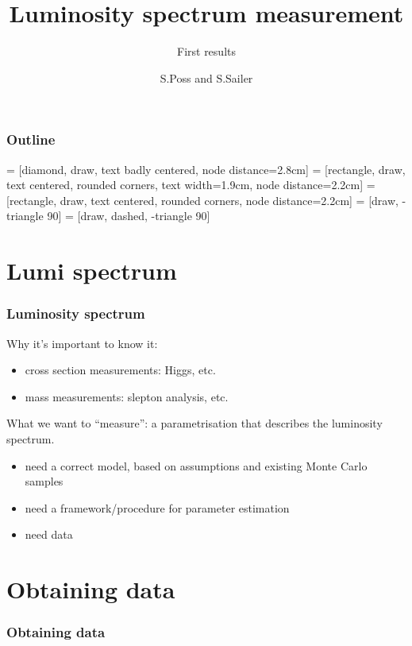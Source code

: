 \documentclass{beamer}
\author{S.Poss and S.Sailer}
\title{Luminosity spectrum measurement}
\subtitle{First results}
\begin{document}
\begin{frame}
\titlepage
\end{frame}
\begin{frame}
\frametitle{Outline}
\tableofcontents
\end{frame}
 = [diamond, draw, text badly centered, node distance=2.8cm]
 = [rectangle, draw, text centered, rounded corners, text width=1.9cm, node distance=2.2cm]
 = [rectangle, draw, text centered, rounded corners, node distance=2.2cm]
 = [draw, -triangle 90]
 = [draw, dashed, -triangle 90]
\section{Lumi spectrum}
\begin{frame}
\frametitle{Luminosity spectrum}
Why it's important to know it:
\begin{itemize}
\item cross section measurements: Higgs, etc.
\item mass measurements: slepton analysis, etc.
\end{itemize}
What we want to ``measure'': a parametrisation that describes the luminosity
spectrum.
\begin{itemize}
\item need a correct model, based on assumptions and existing Monte Carlo
samples
\item need a framework/procedure for parameter estimation
\item need data 
\end{itemize}
\end{frame}
\section{Obtaining data}
\begin{frame}
\frametitle{Obtaining data}
\begin{figure}[h]
\end{figure}
\end{frame}
\end{document}
